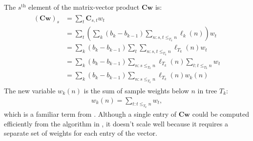 The $s^{\text{th}}$ element of the matrix-vector product $\mathbf{C}\mathbf{w}$ is:
\begin{align} \label{eq:similar_ralph2020}
    \begin{aligned}
        (\mathbf{C}\mathbf{w})_s &=
        \sum_t \mathbf{C}_{s,t} w_t \\
        &=
        \sum_t
        \left(
            \sum_k (b_k - b_{k-1}) \sum_{n: s,t \le_{T_k} n} \ell_k(n)
        \right) {w}_t \\
        &=
        \sum_k (b_k - b_{k-1})
        \sum_t
        \sum_{n: s,t \le_{T_k} n} \ell_{T_k}(n) {w}_t \\
        &=
        \sum_k (b_k - b_{k-1})
        \sum_{n: s\le_{T_k} n} \ell_{T_k}(n)
        \sum_{t:t \le_{T_k} n} {w}_t \\
        &=
        \sum_k (b_k - b_{k-1})
        \sum_{n: s\le_{T_k} n} \ell_{T_k}(n) w_k(n)
    \end{aligned}
\end{align}
The new variable $w_k(n)$ is the sum of sample weights below $n$ in tree $T_k$:
\begin{align}
    w_k(n) = \sum_{t:t \le_{T_k} n} {w}_t ,
\end{align}
which is a familiar term from \citet{ralph2020efficiently}.
Although a single entry of $\mathbf{C}\mathbf{w}$ could be computed efficiently
from the algorithm in \citet{ralph2020efficiently},
it doesn't scale well because it requires a separate set of weights for 
each entry of the vector.


